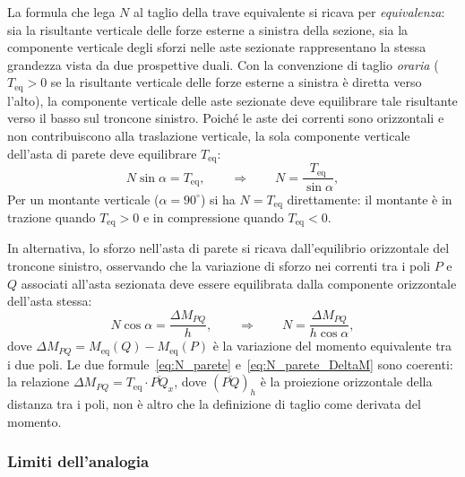 La formula che lega $N$ al taglio della trave
equivalente si ricava per \emph{equivalenza}: sia
la risultante verticale delle forze esterne a
sinistra della sezione, sia la componente verticale
degli sforzi nelle aste sezionate rappresentano
la stessa grandezza vista da due prospettive duali.
Con la convenzione di taglio \emph{oraria}
($T_\text{eq} > 0$ se la risultante verticale
delle forze esterne a sinistra è diretta verso
l'alto), la componente verticale delle aste
sezionate deve equilibrare tale risultante verso
il basso sul troncone sinistro. Poiché le aste
dei correnti sono orizzontali e non contribuiscono
alla traslazione verticale, la sola componente
verticale dell'asta di parete deve equilibrare
$T_\text{eq}$:
\begin{equation}\label{eq:N_parete}
	N \sin\alpha = T_\text{eq},
	\qquad \Rightarrow \qquad
	N = \frac{T_\text{eq}}{\sin\alpha},
\end{equation}
Per un montante verticale ($\alpha = 90^\circ$) si ha
$N = T_\text{eq}$ direttamente: il montante è
in trazione quando $T_\text{eq} > 0$ e in
compressione quando $T_\text{eq} < 0$.

In alternativa, lo sforzo nell'asta di parete
si ricava dall'equilibrio orizzontale del troncone
sinistro, osservando che la variazione di sforzo
nei correnti tra i poli $P$ e $Q$ associati
all'asta sezionata deve essere equilibrata dalla
componente orizzontale dell'asta stessa:
\begin{equation}\label{eq:N_parete_DeltaM}
	N \cos\alpha = \frac{\Delta M_{PQ}}{h},
	\qquad \Rightarrow \qquad
	N = \frac{\Delta M_{PQ}}{h \cos\alpha},
\end{equation}
dove $\Delta M_{PQ} = M_\text{eq}(Q) - M_\text{eq}(P)$
è la variazione del momento equivalente tra i due poli.
Le due formule~\eqref{eq:N_parete}
e~\eqref{eq:N_parete_DeltaM} sono coerenti: la
relazione $\Delta M_{PQ} = T_\text{eq} \cdot \overline{PQ}_x$,
dove $(\overline{PQ})_h$ è la proiezione orizzontale
della distanza tra i poli, non è altro che la
definizione di taglio come derivata del momento.



\subsubsection{Limiti dell'analogia}
\label{subsec:limiti_analogia}

